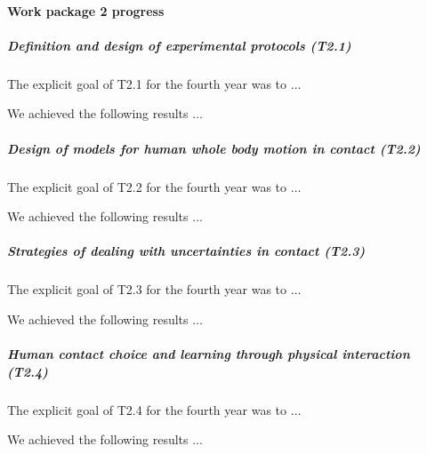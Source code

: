 \paragraph{Work package 2 progress}

\subparagraph{Definition and design of experimental protocols (T2.1)}

The explicit goal of T2.1 for the fourth year was to $\dots$

We achieved the following results $\dots$

\subparagraph{Design of models for human whole body motion in contact (T2.2)}

The explicit goal of T2.2 for the fourth year was to $\dots$

We achieved the following results $\dots$

\subparagraph{Strategies of dealing with uncertainties in contact (T2.3)}

The explicit goal of T2.3 for the fourth year was to $\dots$

We achieved the following results $\dots$


\subparagraph{Human contact choice and learning through physical interaction (T2.4)}

The explicit goal of T2.4 for the fourth year was to $\dots$

We achieved the following results $\dots$
